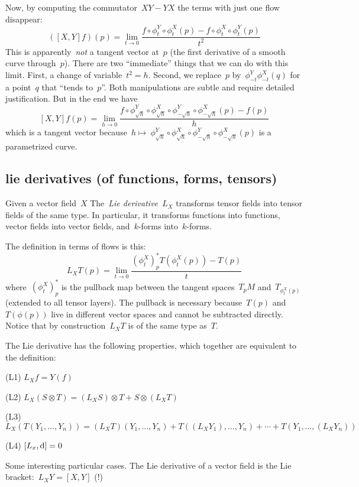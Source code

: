 Now, by computing the commutator~$XY-YX$ the terms with just one flow disappear:
\[
	([X,Y]f)(p) =
	\lim_{t\to0}\frac{
		f\circ\phi^Y_t\circ\phi^X_t(p)
		-
		f\circ\phi^X_t\circ\phi^Y_t(p)
	}{t^2}
\]
This is apparently~\emph{not} a tangent vector at~$p$ (the first derivative of a
smooth curve through~$p$).  There are two ``immediate'' things that we can do
with this limit.  First, a change of variable~$t^2=h$.  Second, we
replace~$p$ by~$\phi^Y_{-t}\phi^X_{-t}(q)$ for a point~$q$ that ``tends
to~$p$''.  Both manipulations are subtle and require detailed justification.
But in the end we have
\[
	[X,Y]f(p)=\lim_{h\to0}\frac{
		f\circ\phi^Y_{\sqrt h}\circ\phi^X_{\sqrt h}
		\circ\phi^Y_{-\sqrt h}\circ\phi^X_{-\sqrt h}(p)
		-f(p)
	}h
\]
which is a tangent vector because~$h\mapsto\
		\phi^Y_{\sqrt h}\circ\phi^X_{\sqrt h}
		\circ\phi^Y_{-\sqrt h}\circ\phi^X_{-\sqrt h}(p)$
		is a parametrized curve.



\subsection{lie derivatives (of functions, forms, tensors)}

Given a vector field~$X$ The~\emph{Lie derivative~$L_X$} transforms tensor
fields into tensor fields of the same type.  In particular, it transforms
functions into functions, vector fields into vector fields, and~$k$-forms
into~$k$-forms.

The definition in terms of flows is this:
\[
	L_X T(p)=\lim_{t\to0}\frac{\left(\phi^X_t\right)^*_pT\left(\phi^X_t(p)\right)-T(p)}t
\]
where~$\left(\phi^X_t\right)^*_p$ is the pullback map between the
tangent spaces~$T_pM$ and~$T_{\phi^X_t(p)}$ (extended to all tensor
layers).  The pullback is necessary because~$T(p)$ and~$T(\phi(p))$ live in
different vector spaces and cannot be subtracted directly.  Notice that by
construction~$L_XT$ is of the same type as~$T$.

The Lie derivative has the following properties, which together are
equivalent to the definition:

(L1) $L_Xf=Y(f)$

(L2) $L_X(S\otimes T)=(L_XS)\otimes T+S\otimes(L_XT)$

(L3) $L_X(T(Y_1,\ldots,Y_n))
=
(L_XT)(Y_1,\ldots,Y_n)
+T((L_XY_1),\ldots,Y_n)
+\cdots
+T(Y_1,\ldots,(L_XY_n))
$

(L4) $[L_x,\mathrm{d}]=0$


Some interesting particular cases. The Lie derivative of a vector field is
the Lie bracket:~$L_XY=[X,Y]$ (!)


